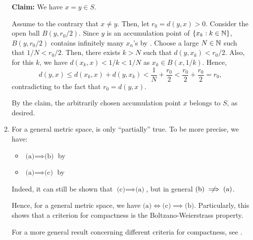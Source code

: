 \begin{enumerate}
\begin{pf}
\textbf{Claim:} We have \(x=y\in S\).

\begin{pf}
Assume to the contrary that \(x\ne y\). Then, let \(r_0=d(y,x)>0\). Consider
the open ball \(B(y,r_0/2)\). Since \(y\) is an accumulation point of
\(\{x_k:k\in\mathbb{N}\}\), \(B(y,r_0/2)\) contains infinitely many \(x_n\)'s by
. Choose a large \(N\in\mathbb{N}\) such that \(1/N<r_0/2\).
Then, there exists \(k>N\) such that \(d(y,x_k)<r_0/2\). Also, for this \(k\),
we have \(d(x_k,x)<1/k<1/N\) as \(x_k\in B(x,1/k)\). Hence,
\[
d(y,x)\le d(x_k,x)+d(y,x_k)
<\frac{1}{N}+\frac{r_0}{2}
<\frac{r_0}{2}+\frac{r_0}{2}
=r_0,
\]
contradicting to the fact that \(r_0=d(y,x)\).
\end{pf}

By the claim, the arbitrarily chosen accumulation point \(x\) belongs to \(S\),
as desired.
\end{pf}

\item For a general metric space,  is only
``partially'' true.  To be more precise, we have:
\begin{itemize}
\item \(\text{(a)}\implies \text{(b)}\) by 
\item \(\text{(a)}\implies \text{(c)}\) by 
\end{itemize}
Indeed, it can still be shown that \(\text{(c)}\implies \text{(a)}\), but in
general \(\text{(b)}\centernot\implies \text{(a)}\).

Hence, for a general metric space, we have \(\text{(a)}\iff \text{(c)}\implies
\text{(b)}\). Particularly, this shows that a criterion for compactness is the
Boltzano-Weierstrass property.

For a more general result concerning different criteria for compactness, see
.
\end{enumerate}
